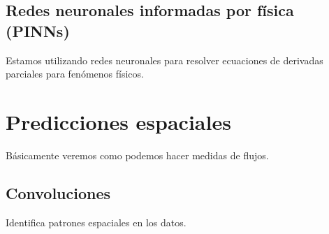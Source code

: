 \subsection{Redes neuronales informadas por física (PINNs)}
Estamos utilizando redes neuronales para resolver ecuaciones de derivadas parciales para fenómenos físicos.


\section{Predicciones espaciales}
Básicamente veremos como podemos hacer medidas de flujos.

\subsection{Convoluciones}
Identifica patrones espaciales en los datos.


